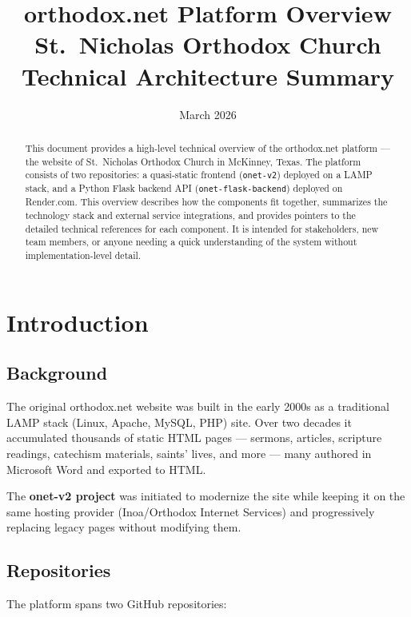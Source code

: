 \documentclass[12pt]{article}
\title{orthodox.net Platform Overview\\[0.5em]\large St.\ Nicholas Orthodox Church\\[0.3em]\small Technical Architecture Summary}
\author{}
\date{March 2026}
\begin{document}
\maketitle

\begin{abstract}
This document provides a high-level technical overview of the orthodox.net platform --- the website of St.\ Nicholas Orthodox Church in McKinney, Texas. The platform consists of two repositories: a quasi-static frontend (\texttt{onet-v2}) deployed on a LAMP stack, and a Python Flask backend API (\texttt{onet-flask-backend}) deployed on Render.com. This overview describes how the components fit together, summarizes the technology stack and external service integrations, and provides pointers to the detailed technical references for each component. It is intended for stakeholders, new team members, or anyone needing a quick understanding of the system without implementation-level detail.
\end{abstract}

\tableofcontents
\newpage

\section{Introduction}

\subsection{Background}

The original orthodox.net website was built in the early 2000s as a traditional LAMP stack (Linux, Apache, MySQL, PHP) site. Over two decades it accumulated thousands of static HTML pages --- sermons, articles, scripture readings, catechism materials, saints' lives, and more --- many authored in Microsoft Word and exported to HTML.

The \textbf{onet-v2 project} was initiated to modernize the site while keeping it on the same hosting provider (Inoa/Orthodox Internet Services) and progressively replacing legacy pages without modifying them.

\subsection{Repositories}

The platform spans two GitHub repositories:
\end{document}
